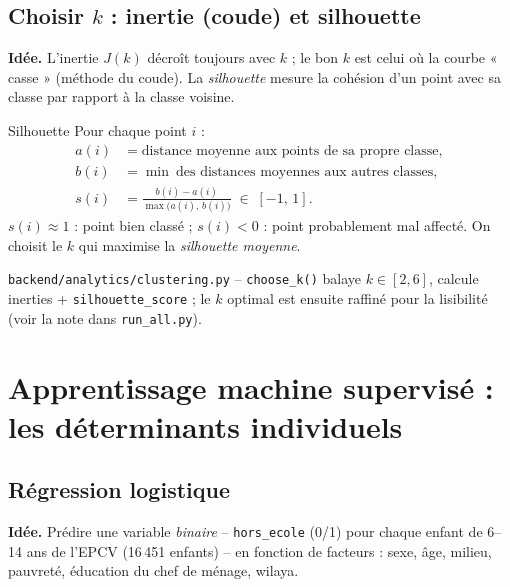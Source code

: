 \documentclass[11pt,a4paper]{article}
\newcommand{\txt}[1]{\texttt{#1}}
\begin{document}
\subsection{Choisir $k$ : inertie (coude) et silhouette}
\label{sec:silhouette}

\textbf{Idée.} L'inertie $J(k)$ décroît toujours avec $k$ ; le bon $k$ est
celui où la courbe « casse » (méthode du coude). La \emph{silhouette} mesure
la cohésion d'un point avec sa classe par rapport à la classe voisine.

\begin{meth}{Silhouette}
Pour chaque point $i$ :
\begin{align*}
a(i) &= \text{distance moyenne aux points de sa propre classe},\\
b(i) &= \min\ \text{des distances moyennes aux autres classes},\\
s(i) &= \frac{b(i)-a(i)}{\max\big(a(i),\,b(i)\big)} \;\in\; [-1,\,1].
\end{align*}
$s(i)\approx 1$ : point bien classé ; $s(i)<0$ : point probablement
mal affecté. On choisit le $k$ qui maximise la \emph{silhouette moyenne}.
\end{meth}

\begin{where}
\txt{backend/analytics/clustering.py} -- \txt{choose\_k()} balaye $k\in[2,6]$,
calcule inerties + \txt{silhouette\_score} ; le $k$ optimal est ensuite
raffiné pour la lisibilité (voir la note dans \txt{run\_all.py}).
\end{where}

\section{Apprentissage machine supervisé : les déterminants individuels}

\subsection{Régression logistique}
\label{sec:logit}

\textbf{Idée.} Prédire une variable \emph{binaire} -- \txt{hors\_ecole}
(0/1) pour chaque enfant de 6--14 ans de l'EPCV (16\,451 enfants) -- en
fonction de facteurs : sexe, âge, milieu, pauvreté, éducation du chef de
ménage, wilaya.
\end{document}
